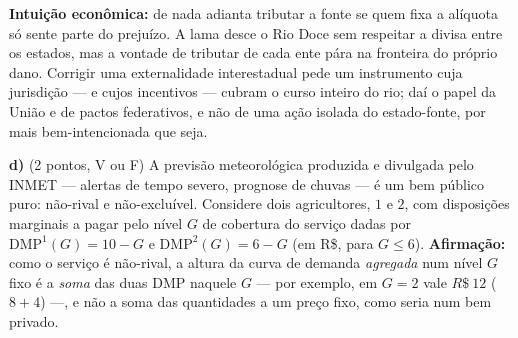 \begin{solucao}
\textbf{Intui\c{c}\~ao econ\^omica:} de nada adianta tributar a fonte se quem fixa a al\'iquota s\'o sente parte do preju\'izo. A lama desce o Rio Doce sem respeitar a divisa entre os estados, mas a vontade de tributar de cada ente p\'ara na fronteira do pr\'oprio dano. Corrigir uma externalidade interestadual pede um instrumento cuja jurisdi\c{c}\~ao --- e cujos incentivos --- cubram o curso inteiro do rio; da\'i o papel da Uni\~ao e de pactos federativos, e n\~ao de uma a\c{c}\~ao isolada do estado-fonte, por mais bem-intencionada que seja.
\end{solucao}

\textbf{d)} (2 pontos, V ou F) A previs\~ao meteorol\'ogica produzida e divulgada pelo INMET --- alertas de tempo severo, prognose de chuvas --- \'e um bem p\'ublico puro: n\~ao-rival e n\~ao-exclu\'ivel. Considere dois agricultores, $1$ e $2$, com disposi\c{c}\~oes marginais a pagar pelo n\'ivel $G$ de cobertura do servi\c{c}o dadas por $\text{DMP}^1(G)=10-G$ e $\text{DMP}^2(G)=6-G$ (em R\$, para $G\le 6$). \textbf{Afirma\c{c}\~ao:} como o servi\c{c}o \'e n\~ao-rival, a altura da curva de demanda \emph{agregada} num n\'ivel $G$ fixo \'e a \emph{soma} das duas DMP naquele $G$ --- por exemplo, em $G=2$ vale $R\$~12$ ($8+4$) ---, e n\~ao a soma das quantidades a um pre\c{c}o fixo, como seria num bem privado.

